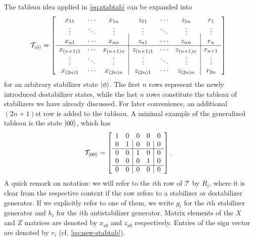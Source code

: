 The tableau idea applied in \cref{eq:stabtab} can be expanded into
\begin{align}\label{eq:new-stabtab}
  \mathcal{T}_{\ket{\phi}} = 
  \left[
    \begin{array}{ccc|ccc|c}
      x_{11} & \cdots & x_{1n} & z_{11} & \cdots & z_{1n} & r_1 \\
      \vdots & \ddots & \vdots & \vdots & \ddots & \vdots & \vdots \\
      x_{n1} & \cdots & x_{nn} & z_{n1} & \cdots & z_{nn} & r_n \\ \hline
      x_{(n+1)1} & \cdots & x_{(n+1)n} & z_{(n+1)1} & \cdots & z_{(n+1)n} & r_{n+1} \\
      \vdots & \ddots & \vdots & \vdots & \ddots & \vdots & \vdots \\
      x_{(2n)1} & \cdots & x_{(2n)n} & z_{(2n)1} & \cdots & z_{(2n)n} & r_{2n}
    \end{array}
  \right]
\end{align}
for an arbitrary stabilizer state $\ket{\phi}$. The first $n$ rows represent
the newly introduced destabilizer states, while the last $n$ rows constitute
the tableau of stabilizers we have already discussed. For later convenience, an
additional $(2n+1)$st row is added to the tableau. A minimal example of the
generalized tableau is the state $\ket{00}$, which has
\begin{align}\label{eq:new-stabtab-example}
  \mathcal{T}_{\ket{00}} = 
  \left[
    \begin{array}{cc|cc|c}
      1 & 0 & 0 & 0 & 0 \\
      0 & 1 & 0 & 0 & 0 \\ \hline
      0 & 0 & 1 & 0 & 0 \\
      0 & 0 & 0 & 1 & 0 \\ \hline
      0 & 0 & 0 & 0 & 0 
    \end{array}
  \right]
.\end{align}
A quick remark on notation: we will refer to the $i$th row of $\mathcal{T}$ by
$R_i$, where it is clear from the respective context if the row refers to a
stabilizer or destabilizer generator. If we explicitly refer to one of them, we
write $g_i$ for the $i$th stabilizer generator and $h_i$ for the $i$th
antistabilizer generator. Matrix elements of the $X$ and $Z$ matrices are
denoted by $x_{ab}$ and $z_{ab}$ respectively. Entries of the sign vector are
denoted by $r_i$ (cf. \cref{eq:new-stabtab}).

